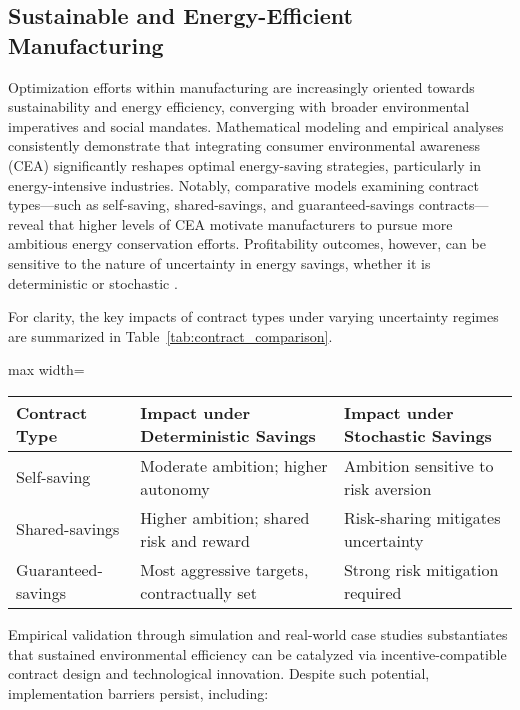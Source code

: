 \documentclass[sigconf]{acmart}
\begin{document}
\subsection{Sustainable and Energy-Efficient Manufacturing}

Optimization efforts within manufacturing are increasingly oriented towards sustainability and energy efficiency, converging with broader environmental imperatives and social mandates. Mathematical modeling and empirical analyses consistently demonstrate that integrating consumer environmental awareness (CEA) significantly reshapes optimal energy-saving strategies, particularly in energy-intensive industries. Notably, comparative models examining contract types—such as self-saving, shared-savings, and guaranteed-savings contracts—reveal that higher levels of CEA motivate manufacturers to pursue more ambitious energy conservation efforts. Profitability outcomes, however, can be sensitive to the nature of uncertainty in energy savings, whether it is deterministic or stochastic \cite{ref80}.

For clarity, the key impacts of contract types under varying uncertainty regimes are summarized in Table~\ref{tab:contract_comparison}.

\begin{table*}[htbp]
\centering
\caption{Impacts of Contract Type and Uncertainty on Manufacturer Energy-Saving Decisions}
\label{tab:contract_comparison}
\begin{adjustbox}{max width=\textwidth}
\begin{tabular}{lll}
\toprule
\textbf{Contract Type} & \textbf{Impact under Deterministic Savings} & \textbf{Impact under Stochastic Savings} \\
\midrule
Self-saving            & Moderate ambition; higher autonomy          & Ambition sensitive to risk aversion      \\
Shared-savings         & Higher ambition; shared risk and reward     & Risk-sharing mitigates uncertainty       \\
Guaranteed-savings     & Most aggressive targets, contractually set  & Strong risk mitigation required          \\
\bottomrule
\end{tabular}
\end{adjustbox}
\end{table*}

Empirical validation through simulation and real-world case studies substantiates that sustained environmental efficiency can be catalyzed via incentive-compatible contract design and technological innovation. Despite such potential, implementation barriers persist, including:
\end{document}

